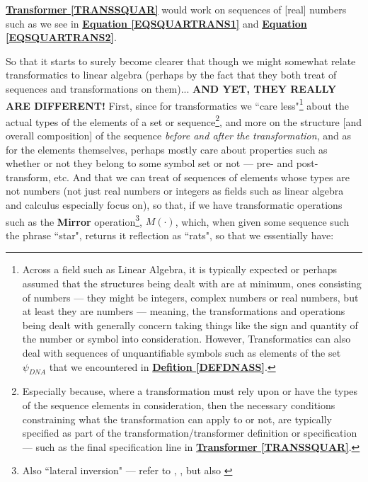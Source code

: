 \documentclass[a4paper, 18pt]{book} %
\begin{document}
\begin{appendices}
\vspace{2em}

\textbf{\hyperref[TRANSSQUAR]{Transformer \ref{TRANSSQUAR}}} would work on sequences of [real] numbers such as we see in \textbf{\hyperref[EQSQUARTRANS1]{Equation \ref{EQSQUARTRANS1}}} and \textbf{\hyperref[EQSQUARTRANS2]{Equation \ref{EQSQUARTRANS2}}}.




\vspace{2em}


So that it starts to surely become clearer that though we might somewhat relate transformatics to linear algebra (perhaps by the fact that they both treat of sequences and transformations on them)... \textbf{AND YET, THEY REALLY ARE DIFFERENT!} First, since for transformatics we ``care less"\footnote{Across a field such as Linear Algebra, it is typically expected or perhaps assumed that the structures being dealt with are at minimum, ones consisting of numbers --- they might be integers, complex numbers or real numbers, but at least they are numbers --- meaning, the transformations and operations being dealt with generally concern taking things like the sign and quantity of the number or symbol into consideration. However, Transformatics can also deal with sequences of unquantifiable symbols such as elements of the set $\psi_{DNA}$ that we encountered in \textbf{\hyperref[DEFDNASS]{Defition \ref{DEFDNASS}}}.} about the actual types of the elements of a set or sequence\footnote{Especially because, where a transformation must rely upon or have the types of the sequence elements in consideration, then the necessary conditions constraining what the transformation can apply to or not, are typically specified as part of the transformation/transformer definition or specification --- such as the final specification line in \textbf{\hyperref[TRANSSQUAR]{Transformer \ref{TRANSSQUAR}}}.}, and more on the structure [and overall composition] of the sequence \textit{before and after the transformation}, and as for the elements themselves, perhaps mostly care about properties such as whether or not they belong to some symbol set or not --- pre- and post-transform, etc. And that we can treat of sequences of elements whose types are not numbers (not just real numbers or integers as fields such as linear algebra and calculus especially focus on), so that, if we have transformatic operations such as the \textbf{Mirror} operation\footnote{Also ``lateral inversion" --- refer to \cite{transformatics}, \cite{Lutalo2024TEATAZ}, but also \cite{lutalo_2025_grimlumtauto}}, $M(\cdot)$, which, when given some sequence such the phrase ``star", returns it reflection as ``rats", so that we essentially have:


\end{appendices}
\end{document}

